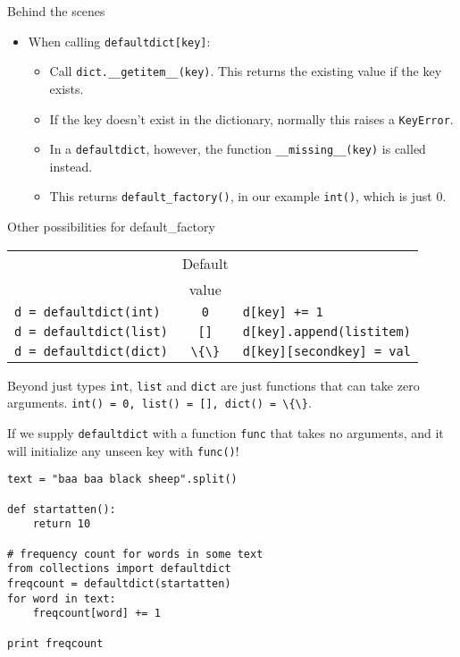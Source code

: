 \documentclass{beamer}
\begin{document}
\begin{frame}{Behind the scenes}
\begin{itemize}

  \item When calling \lstinline$defaultdict[key]$:
    \begin{itemize}
      \item Call \lstinline$dict.__getitem__(key)$. This returns the existing value if the key exists.
      \item If the key doesn't exist in the dictionary, normally this raises a \lstinline$KeyError$.
      \item In a \lstinline$defaultdict$, however, the function \lstinline$__missing__(key)$ is called instead.
      \item This returns \lstinline$default_factory()$, in our example \lstinline$int()$, which is just 0.
    \end{itemize}
  
\end{itemize}

\end{frame}

\begin{frame}{Other possibilities for default\_factory}
 \begin{tabular}{lcl}
      & Default & \\
      & value   & \\
   \lstinline$d = defaultdict(int)$  & \lstinline$0$ & \lstinline$d[key] += 1$ \\
   \lstinline$d = defaultdict(list)$ & \lstinline$[]$ & \lstinline$d[key].append(listitem)$ \\
   \lstinline$d = defaultdict(dict)$ & \lstinline$\{\}$ & \lstinline$d[key][secondkey] = val$ \\
 \end{tabular}
\end{frame}

\begin{frame}{Beyond just types}
 \lstinline$int$, \lstinline$list$ and \lstinline$dict$ are just functions that can take zero arguments.
 \lstinline$int() = 0, list() = [], dict() = \{\}$.

 \bigskip

 If we supply \lstinline$defaultdict$ with a function \lstinline$func$ that takes no arguments,
 and it will initialize any unseen key with \lstinline$func()$!
\end{frame}

\begin{lrbox}{\mysavebox}
\begin{lstlisting}
text = "baa baa black sheep".split()

def startatten():
    return 10

# frequency count for words in some text
from collections import defaultdict
freqcount = defaultdict(startatten)
for word in text:
    freqcount[word] += 1

print freqcount 
\end{lstlisting}
\end{lrbox}
\end{document}
